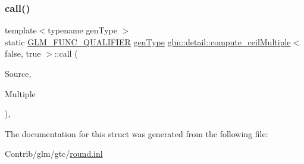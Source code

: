 \subsubsection{\texorpdfstring{call()}{call()}}
{\footnotesize\ttfamily template$<$typename gen\+Type $>$ \\
static \mbox{\hyperlink{setup_8hpp_a33fdea6f91c5f834105f7415e2a64407}{G\+L\+M\+\_\+\+F\+U\+N\+C\+\_\+\+Q\+U\+A\+L\+I\+F\+I\+ER}} \mbox{\hyperlink{structglm_1_1detail_1_1gen_type}{gen\+Type}} \mbox{\hyperlink{structglm_1_1detail_1_1compute__ceil_multiple}{glm\+::detail\+::compute\+\_\+ceil\+Multiple}}$<$ false, true $>$\+::call (\begin{DoxyParamCaption}\item[{\mbox{\hyperlink{structglm_1_1detail_1_1gen_type}{gen\+Type}}}]{Source,  }\item[{\mbox{\hyperlink{structglm_1_1detail_1_1gen_type}{gen\+Type}}}]{Multiple }\end{DoxyParamCaption})\hspace{0.3cm}{\ttfamily [inline]}, {\ttfamily [static]}}



The documentation for this struct was generated from the following file\+:\begin{DoxyCompactItemize}
\item 
Contrib/glm/gtc/\mbox{\hyperlink{round_8inl}{round.\+inl}}\end{DoxyCompactItemize}
